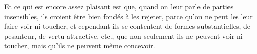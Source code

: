 Et ce qui est encore assez plaisant est que, quand on leur parle de parties insensibles, ils croient être bien fondés à les rejeter, parce qu'on ne peut les leur faire voir ni toucher, et cependant ils se contentent de formes substantielles, de pesanteur, de vertu attractive, etc., que non seulement ils ne peuvent voir ni toucher, mais qu'ils ne peuvent même concevoir.
